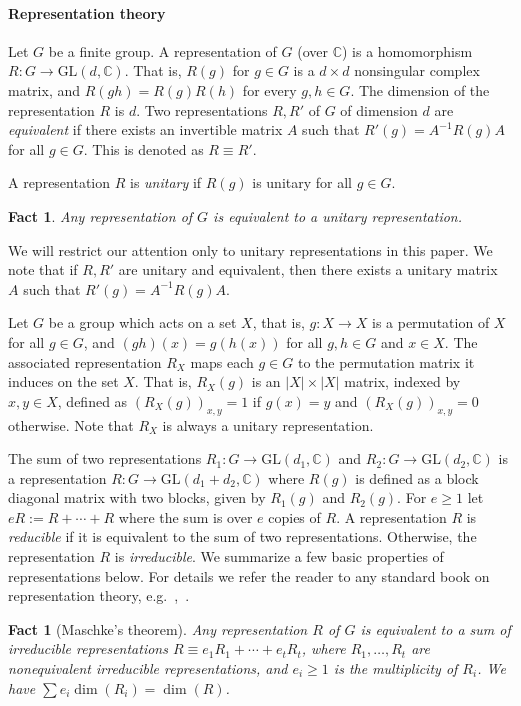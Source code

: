 \documentclass[10pt]{article}
\newtheorem{fact}[theorem]{Fact}
\theoremstyle{definition}
\providecommand{\eg}{e.g.\ }
\numberwithin{equation}{section}
\def\C{\mathbb{C}}
\def\GL{\textrm{GL}}
\begin{document}
\paragraph{Representation theory}
Let $G$ be a finite group. A representation of $G$ (over $\C$) is a
homomorphism $R:G \to \GL(d,\C)$. That is, $R(g)$ for $g \in G$ is a
$d \times d$ nonsingular
complex matrix, and $R(gh) = R(g) R(h)$ for every $g,h \in
G$. The dimension of the representation $R$ is $d$. Two representations
$R,R'$ of $G$ of dimension $d$ are \emph{equivalent} if there exists an
invertible matrix $A$ such that $R'(g) = A^{-1} R(g) A$ for all $g \in
G$. This is denoted as $R \equiv R'$.

A representation $R$ is \emph{unitary}
if $R(g)$ is unitary for all $g \in G$.
\begin{fact}
Any representation of $G$ is equivalent to a unitary representation.
\end{fact}
We will restrict our attention only to unitary representations in this
paper. We note that if $R,R'$ are unitary and equivalent, then there
exists a unitary matrix $A$ such that $R'(g) = A^{-1} R(g) A$.

Let $G$ be a group which acts on a set $X$, that is, $g:X \to X$ is
a permutation of $X$ for all $g \in G$, and $(gh)(x)=g(h(x))$ for all
$g,h \in G$ and $x \in X$. The associated representation $R_X$ maps each
$g \in G$ to the permutation matrix it induces on the set $X$. That is,
$R_X(g)$ is an $|X| \times |X|$ matrix, indexed by $x,y \in X$, defined
as $(R_X(g))_{x,y}=1$ if $g(x)=y$ and $(R_X(g))_{x,y}=0$ otherwise. Note
that $R_X$ is always a unitary representation.

The sum of two representations $R_1:G \to \GL(d_1,\C)$ and $R_2:G \to
\GL(d_2,\C)$ is a representation $R:G \to \GL(d_1+d_2,\C)$ where $R(g)$ is
defined as a block diagonal matrix with two blocks, given by $R_1(g)$ and
$R_2(g)$. For $e \ge 1$ let $e R := R+\cdots+R$ where the sum is over $e$
copies of $R$. A representation $R$ is \emph{reducible} if it is equivalent
to the sum of two representations. Otherwise, the representation
$R$ is \emph{irreducible}. We summarize a few basic properties of
representations below. For details we refer the reader to any standard
book on representation theory, \eg,~\cite{RepresentationTheory}.

\begin{fact}[Maschke's theorem]\label{fact:maschke}
Any representation $R$ of $G$ is equivalent to a sum of irreducible
representations $R \equiv e_1 R_1+\cdots+e_ tR_t$, where $R_1,\ldots,R_t$
are nonequivalent irreducible representations, and $e_i \ge 1$ is the
multiplicity of $R_i$. We have $\sum e_i \dim(R_i) = \dim(R)$.
\end{fact}
\end{document}
